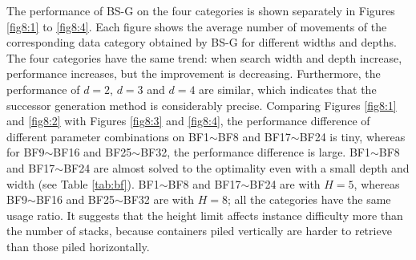 \documentclass[review,3p,times,authoryear,12pt]{elsarticle}
\begin{document}
The performance of BS-G on the four categories is shown separately in Figures \ref{fig8:1} to \ref{fig8:4}.
Each figure shows the average number of movements of the corresponding data category obtained by BS-G for different widths and depths.
The four categories have the same trend: when search width and depth increase, performance increases, but the improvement is decreasing. Furthermore, the performance of $d=2$, $d=3$ and $d=4$ are similar, which indicates that the successor generation method is considerably precise.
Comparing Figures \ref{fig8:1} and \ref{fig8:2} with Figures \ref{fig8:3} and \ref{fig8:4}, the performance difference of different parameter combinations on BF1$\sim$BF8 and BF17$\sim$BF24 is tiny, whereas for BF9$\sim$BF16 and BF25$\sim$BF32, the performance difference is large.
BF1$\sim$BF8 and BF17$\sim$BF24 are almost solved to the optimality even with a small depth and width (see Table \ref{tab:bf}).
BF1$\sim$BF8 and BF17$\sim$BF24 are with $H=5$, whereas BF9$\sim$BF16 and BF25$\sim$BF32 are with $H=8$; all the categories have the same usage ratio.
It suggests that the height limit affects instance difficulty more than the number of stacks, because containers piled vertically are harder to retrieve than those piled horizontally.
\end{document}

